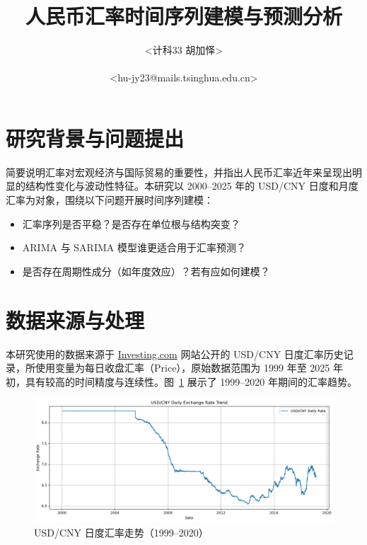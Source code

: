 \documentclass[11pt,a4paper]{article}
\title{\textbf{人民币汇率时间序列建模与预测分析}}
\author{<计科33 胡加怿>\\<2023011431>\\<hu-jy23@mails.tsinghua.edu.cn>}
\begin{document}
\maketitle

\tableofcontents
\newpage

\section{研究背景与问题提出}
简要说明汇率对宏观经济与国际贸易的重要性，并指出人民币汇率近年来呈现出明显的结构性变化与波动性特征。本研究以 2000--2025 年的 USD/CNY 日度和月度汇率为对象，围绕以下问题开展时间序列建模：

\begin{itemize}
  \item 汇率序列是否平稳？是否存在单位根与结构突变？
  \item ARIMA 与 SARIMA 模型谁更适合用于汇率预测？
  \item 是否存在周期性成分（如年度效应）？若有应如何建模？
\end{itemize}

\section{数据来源与处理}

本研究使用的数据来源于 \href{https://www.investing.com/}{Investing.com} 网站公开的 USD/CNY 日度汇率历史记录，所使用变量为每日收盘汇率（Price），原始数据范围为 1999 年至 2025 年初，具有较高的时间精度与连续性。图~\ref{fig:rate-full} 展示了 1999--2020 年期间的汇率趋势。

\begin{figure}[H]
  \centering
  \includegraphics[width=1\textwidth]{./figures/2000-2020.png}
  \caption{USD/CNY 日度汇率走势（1999--2020）}
  \label{fig:rate-full}
\end{figure}
\end{document}
